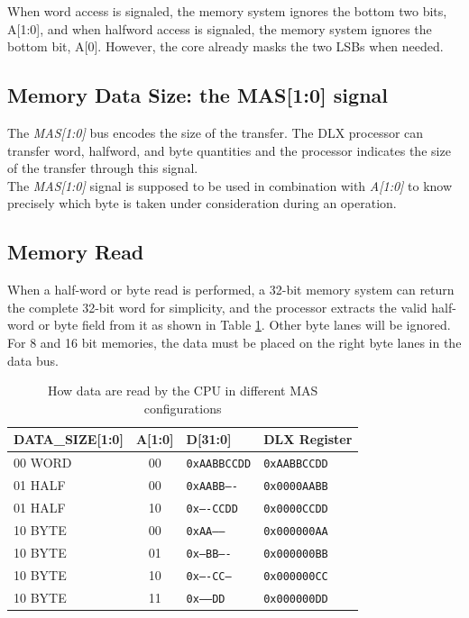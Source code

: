 When word access is signaled, the memory system ignores the bottom two bits, A[1:0], and when halfword access is signaled, the memory system ignores the bottom bit, A[0]. However, the core already masks the two LSBs when needed.

\subsection{Memory Data Size: the MAS[1:0] signal}
\label{mas}

The \emph{MAS[1:0]} bus encodes the size of the transfer. The DLX processor can transfer word, halfword, and byte quantities and the processor indicates the size of the transfer through this signal.\\

The \emph{MAS[1:0]} signal is supposed to be used in combination with \emph{A[1:0]} to know precisely which byte is taken under consideration during an operation.

\subsection{Memory Read}

When a half-word or byte read is performed, a 32-bit memory system can return the complete 32-bit word for simplicity, and the processor extracts the valid half-word or byte field from it as shown in Table \ref{table:memory_read_configuration}. Other byte lanes will be ignored. For 8 and 16 bit memories, the data must be placed on the right byte lanes in the data bus.

\begin{table}[H]
    \centering
    \begin{tabular}{|l|c|l|l|}
    \hline
        DATA\_SIZE[1:0] & A[1:0] & D[31:0] & DLX Register \\ \hline
        00 WORD & 00 & \texttt{0xAABBCCDD} & \texttt{0xAABBCCDD} \\ \hline
        01 HALF & 00 & \texttt{0xAABB----} & \texttt{0x0000AABB} \\ \hline
        01 HALF & 10 & \texttt{0x----CCDD} & \texttt{0x0000CCDD} \\ \hline
        10 BYTE & 00 & \texttt{0xAA------} & \texttt{0x000000AA} \\ \hline
        10 BYTE & 01 & \texttt{0x--BB----} & \texttt{0x000000BB} \\ \hline
        10 BYTE & 10 & \texttt{0x----CC--} & \texttt{0x000000CC} \\ \hline
        10 BYTE & 11 & \texttt{0x------DD} & \texttt{0x000000DD} \\ \hline
    \end{tabular}
    \caption{How data are read by the CPU in different MAS configurations}
    \label{table:memory_read_configuration}
\end{table}

